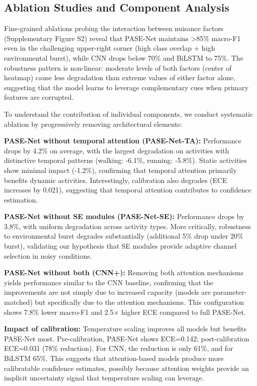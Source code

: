 \documentclass[lettersize,journal]{IEEEtran}
\begin{document}
\subsection{Ablation Studies and Component Analysis}

Fine-grained ablations probing the interaction between nuisance factors (Supplementary Figure S2) reveal that PASE-Net maintains >85\% macro-F1 even in the challenging upper-right corner (high class overlap + high environmental burst), while CNN drops below 70\% and BiLSTM to 75\%. The robustness pattern is non-linear: moderate levels of both factors (center of heatmap) cause less degradation than extreme values of either factor alone, suggesting that the model learns to leverage complementary cues when primary features are corrupted.

To understand the contribution of individual components, we conduct systematic ablation by progressively removing architectural elements:

\textbf{PASE-Net without temporal attention (PASE-Net-TA):} Performance drops by 4.2\% on average, with the largest degradation on activities with distinctive temporal patterns (walking: -6.1\%, running: -5.8\%). Static activities show minimal impact (-1.2\%), confirming that temporal attention primarily benefits dynamic activities. Interestingly, calibration also degrades (ECE increases by 0.021), suggesting that temporal attention contributes to confidence estimation.

\textbf{PASE-Net without SE modules (PASE-Net-SE):} Performance drops by 3.8\%, with uniform degradation across activity types. More critically, robustness to environmental burst degrades substantially (additional 5\% drop under 20\% burst), validating our hypothesis that SE modules provide adaptive channel selection in noisy conditions.

\textbf{PASE-Net without both (CNN+):} Removing both attention mechanisms yields performance similar to the CNN baseline, confirming that the improvements are not simply due to increased capacity (models are parameter-matched) but specifically due to the attention mechanisms. This configuration shows 7.8\% lower macro-F1 and 2.5× higher ECE compared to full PASE-Net.

\textbf{Impact of calibration:} Temperature scaling improves all models but benefits PASE-Net most. Pre-calibration, PASE-Net shows ECE=0.142; post-calibration ECE=0.031 (78\% reduction). For CNN, the reduction is only 61\%, and for BiLSTM 65\%. This suggests that attention-based models produce more calibratable confidence estimates, possibly because attention weights provide an implicit uncertainty signal that temperature scaling can leverage.
\end{document}
